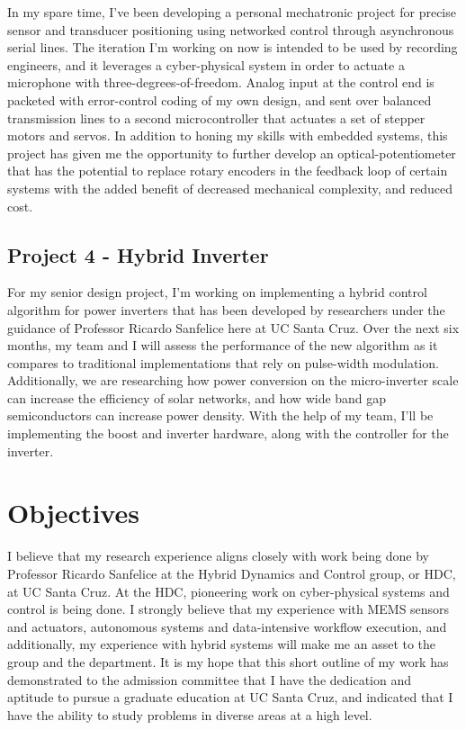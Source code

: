 \documentclass[journal]{IEEEtran}
\begin{document}
In my spare time, I've been developing a personal mechatronic project for precise sensor and transducer positioning using networked control through asynchronous serial lines. The iteration I'm working on now is intended to be used by recording engineers, and it leverages a cyber-physical system in order to actuate a microphone with three-degrees-of-freedom. Analog input at the control end is packeted with error-control coding of my own design, and sent over balanced transmission lines to a second microcontroller that actuates a set of stepper motors and servos. In addition to honing my skills with embedded systems, this project has given me the opportunity to further develop an optical-potentiometer that has the potential to replace rotary encoders in the feedback loop of certain systems with the added benefit of decreased mechanical complexity, and reduced cost. 

\subsection{Project 4 - Hybrid Inverter}

For my senior design project, I'm working on implementing a hybrid control algorithm for power inverters that has been developed by researchers under the guidance of Professor Ricardo Sanfelice here at UC Santa Cruz. Over the next six months, my team and I will assess the performance of the new algorithm as it compares to traditional implementations that rely on pulse-width modulation. Additionally, we are researching how power conversion on the micro-inverter scale can increase the efficiency of solar networks, and how wide band gap semiconductors can increase power density. With the help of my team, I'll be implementing the boost and inverter hardware, along with the controller for the inverter. 
 
\section{Objectives}

I believe that my research experience aligns closely with work being done by Professor Ricardo Sanfelice at the Hybrid Dynamics and Control group, or HDC, at UC Santa Cruz. At the HDC, pioneering work on cyber-physical systems and control is being done. I strongly believe that my experience with MEMS sensors and actuators, autonomous systems and data-intensive workflow execution, and additionally, my experience with hybrid systems will make me an asset to the group and the department.
It is my hope that this short outline of my work has demonstrated to the admission committee that I have the dedication and aptitude to pursue a graduate education at UC Santa Cruz, and indicated that I have the ability to study problems in diverse areas at a high level.
\end{document}
